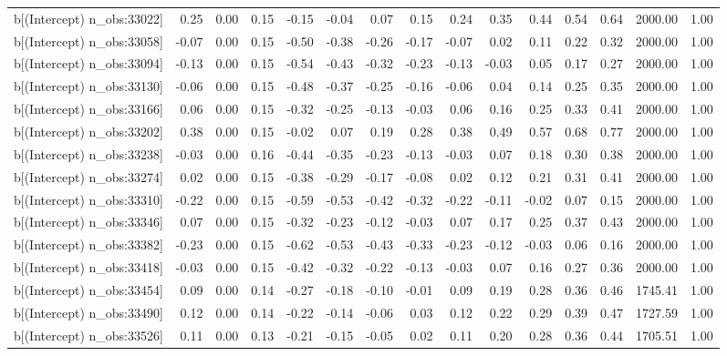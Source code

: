 \begin{table}[ht]
\begin{tabular}{rrrrrrrrrrrrrrr}
  b[(Intercept) n\_obs:33022] & 0.25 & 0.00 & 0.15 & -0.15 & -0.04 & 0.07 & 0.15 & 0.24 & 0.35 & 0.44 & 0.54 & 0.64 & 2000.00 & 1.00 \\ 
  b[(Intercept) n\_obs:33058] & -0.07 & 0.00 & 0.15 & -0.50 & -0.38 & -0.26 & -0.17 & -0.07 & 0.02 & 0.11 & 0.22 & 0.32 & 2000.00 & 1.00 \\ 
  b[(Intercept) n\_obs:33094] & -0.13 & 0.00 & 0.15 & -0.54 & -0.43 & -0.32 & -0.23 & -0.13 & -0.03 & 0.05 & 0.17 & 0.27 & 2000.00 & 1.00 \\ 
  b[(Intercept) n\_obs:33130] & -0.06 & 0.00 & 0.15 & -0.48 & -0.37 & -0.25 & -0.16 & -0.06 & 0.04 & 0.14 & 0.25 & 0.35 & 2000.00 & 1.00 \\ 
  b[(Intercept) n\_obs:33166] & 0.06 & 0.00 & 0.15 & -0.32 & -0.25 & -0.13 & -0.03 & 0.06 & 0.16 & 0.25 & 0.33 & 0.41 & 2000.00 & 1.00 \\ 
  b[(Intercept) n\_obs:33202] & 0.38 & 0.00 & 0.15 & -0.02 & 0.07 & 0.19 & 0.28 & 0.38 & 0.49 & 0.57 & 0.68 & 0.77 & 2000.00 & 1.00 \\ 
  b[(Intercept) n\_obs:33238] & -0.03 & 0.00 & 0.16 & -0.44 & -0.35 & -0.23 & -0.13 & -0.03 & 0.07 & 0.18 & 0.30 & 0.38 & 2000.00 & 1.00 \\ 
  b[(Intercept) n\_obs:33274] & 0.02 & 0.00 & 0.15 & -0.38 & -0.29 & -0.17 & -0.08 & 0.02 & 0.12 & 0.21 & 0.31 & 0.41 & 2000.00 & 1.00 \\ 
  b[(Intercept) n\_obs:33310] & -0.22 & 0.00 & 0.15 & -0.59 & -0.53 & -0.42 & -0.32 & -0.22 & -0.11 & -0.02 & 0.07 & 0.15 & 2000.00 & 1.00 \\ 
  b[(Intercept) n\_obs:33346] & 0.07 & 0.00 & 0.15 & -0.32 & -0.23 & -0.12 & -0.03 & 0.07 & 0.17 & 0.25 & 0.37 & 0.43 & 2000.00 & 1.00 \\ 
  b[(Intercept) n\_obs:33382] & -0.23 & 0.00 & 0.15 & -0.62 & -0.53 & -0.43 & -0.33 & -0.23 & -0.12 & -0.03 & 0.06 & 0.16 & 2000.00 & 1.00 \\ 
  b[(Intercept) n\_obs:33418] & -0.03 & 0.00 & 0.15 & -0.42 & -0.32 & -0.22 & -0.13 & -0.03 & 0.07 & 0.16 & 0.27 & 0.36 & 2000.00 & 1.00 \\ 
  b[(Intercept) n\_obs:33454] & 0.09 & 0.00 & 0.14 & -0.27 & -0.18 & -0.10 & -0.01 & 0.09 & 0.19 & 0.28 & 0.36 & 0.46 & 1745.41 & 1.00 \\ 
  b[(Intercept) n\_obs:33490] & 0.12 & 0.00 & 0.14 & -0.22 & -0.14 & -0.06 & 0.03 & 0.12 & 0.22 & 0.29 & 0.39 & 0.47 & 1727.59 & 1.00 \\ 
  b[(Intercept) n\_obs:33526] & 0.11 & 0.00 & 0.13 & -0.21 & -0.15 & -0.05 & 0.02 & 0.11 & 0.20 & 0.28 & 0.36 & 0.44 & 1705.51 & 1.00 \\ 

\end{tabular}
\end{table}
